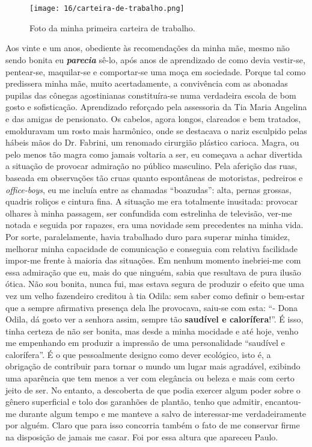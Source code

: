 \chapter{}

\begin{figure}
\centering
\texttt{[image: 16/carteira-de-trabalho.png]}
\caption{Foto da minha primeira carteira de trabalho.}
\end{figure}

Aos vinte e um anos, obediente às recomendações da minha mãe, mesmo não sendo bonita eu \textbf{\textit{parecia}} sê-lo, após anos de aprendizado de como devia vestir-se, pentear-se, maquilar-se e comportar-se uma moça em sociedade.
Porque tal como predissera minha mãe, muito acertadamente, a convivência com as abonadas pupilas das cônegas agostinianas constituíra-se numa verdadeira escola de bom gosto e sofisticação.
Aprendizado reforçado pela assessoria da Tia Maria Angelina e das amigas de pensionato.
Os cabelos, agora longos, clareados e bem tratados, emolduravam um rosto mais harmônico, onde se destacava o nariz esculpido pelas hábeis mãos do Dr.
Fabrini, um renomado cirurgião plástico carioca.
Magra, ou pelo menos tão magra como jamais voltaria a ser, eu começava a achar divertida a situação de provocar admiração no público masculino.
Pela aferição das ruas, baseada em observações tão cruas quanto espontâneas de motoristas, pedreiros e \textit{office-boys}, eu me incluía entre as chamadas ``boazudas'': alta, pernas grossas, quadris roliços e cintura fina.
A situação me era totalmente inusitada: provocar olhares à minha passagem, ser confundida com estrelinha de televisão, ver-me notada e seguida por rapazes, era uma novidade sem precedentes na minha vida.
Por sorte, paralelamente, havia trabalhado duro para superar minha timidez, melhorar minha capacidade de comunicação e conseguia com relativa facilidade impor-me frente à maioria das situações.
Em nenhum momento inebriei-me com essa admiração que eu, mais do que ninguém, sabia que resultava de pura ilusão ótica.
Não sou bonita, nunca fui, mas estava segura de produzir o efeito que uma vez um velho fazendeiro creditou à tia Odila: sem saber como definir o bem-estar que a sempre afirmativa presença dela lhe provocava, saiu-se com esta: ``- Dona Odila, dá gosto ver a senhora assim, sempre tão \textbf{saudível e calorífera}!''.
É isso, tinha certeza de não ser bonita, mas desde a minha mocidade e até hoje, venho me empenhando em produzir a impressão de uma personalidade ``saudível e calorífera''.
É o que pessoalmente designo como dever ecológico, isto é, a obrigação de contribuir para tornar o mundo um lugar mais agradável, exibindo uma aparência que tem menos a ver com elegância ou beleza e mais com certo jeito de ser.
No entanto, a descoberta de que podia exercer algum poder sobre o gênero superficial e tolo dos garanhões de plantão, tenho que admitir, encantou-me durante algum tempo e me manteve a salvo de interessar-me verdadeiramente por alguém.
Claro que para isso concorria também o fato de me conservar firme na disposição de jamais me casar.
Foi por essa altura que apareceu Paulo.

